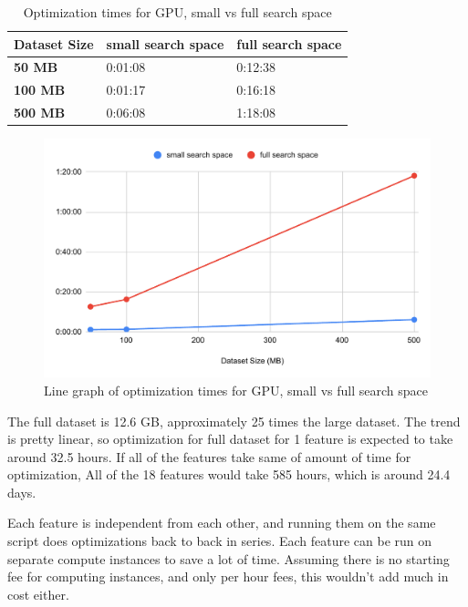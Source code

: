 \documentclass[12pt,twoside]{report}
\begin{document}
\begin{table}[h]
\centering
\begin{tabular}{|l|l|l|}
\hline
\textbf{Dataset Size} & \textbf{small search space} & \textbf{full search space} \\ \hline
\textbf{50 MB}        & 0:01:08                     & 0:12:38                    \\ \hline
\textbf{100 MB}       & 0:01:17                     & 0:16:18                    \\ \hline
\textbf{500 MB}       & 0:06:08                     & 1:18:08                    \\ \hline
\end{tabular}
\caption{Optimization times for GPU, small vs full search space}
\label{tab:gpu-search-spaces}
\end{table}

\begin{figure}[H]
\centering
\includegraphics[width = 0.8\hsize]{figures/efficiency/gpu.pdf}
\caption{Line graph of optimization times for GPU, small vs full search space}
\label{fig:gpu}
\end{figure}

The full dataset is 12.6 GB, approximately 25 times the large dataset. The trend is pretty linear, so optimization for full dataset for 1 feature is expected to take around 32.5 hours. If all of the features take same of amount of time for optimization, All of the 18 features would take 585 hours, which is around 24.4 days.

Each feature is independent from each other, and running them on the same script does optimizations back to back in series. Each feature can be run on separate compute instances to save a lot of time. Assuming there is no starting fee for computing instances, and only per hour fees, this wouldn’t add much in cost either.
\end{document}
